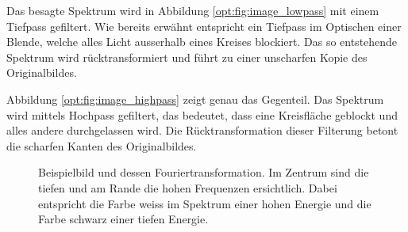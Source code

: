Das besagte Spektrum wird in Abbildung \ref{opt:fig:image_lowpass} mit einem Tiefpass gefiltert.
Wie bereits erwähnt entspricht ein Tiefpass im Optischen einer Blende, welche alles Licht ausserhalb eines Kreises blockiert.
Das so entstehende Spektrum wird rücktransformiert und führt zu einer unscharfen Kopie des Originalbildes.

Abbildung \ref{opt:fig:image_highpass} zeigt genau das Gegenteil. 
Das Spektrum wird mittels Hochpass gefiltert, das bedeutet, dass eine Kreisfläche geblockt und alles andere durchgelassen wird.
Die Rücktransformation dieser Filterung betont die scharfen Kanten des Originalbildes. 

\begin{figure}
    \centering

    \caption{Beispielbild und dessen Fouriertransformation.
    Im Zentrum sind die tiefen und am Rande die hohen Frequenzen ersichtlich.
    Dabei entspricht die Farbe weiss im Spektrum einer hohen Energie und die Farbe schwarz einer tiefen Energie.}
    \label{opt:fig:image_raw}
\end{figure}

